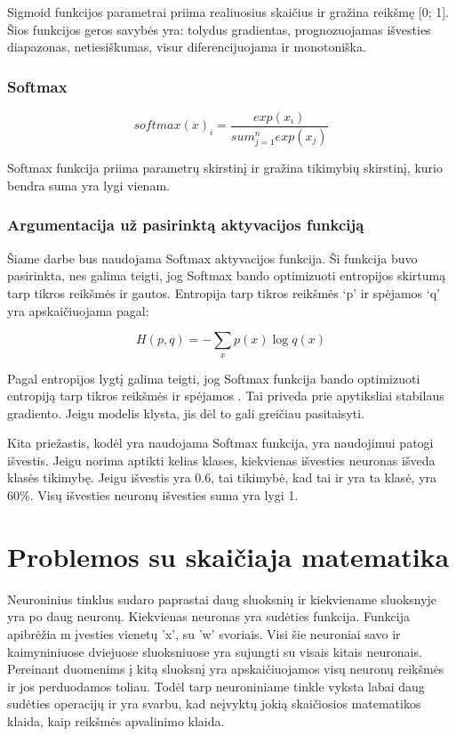 \documentclass{VUMIFInfKursinis}
\begin{document}
\par
Sigmoid funkcijos parametrai priima realiuosius skaičius ir gražina reikšmę [0; 1].
Šios funkcijos geros savybės yra: tolydus gradientas, prognozuojamas išvesties
diapazonas, netiesiškumas, visur diferencijuojama ir monotoniška. \cite{salt16}

\subsubsection{Softmax}
\[
  softmax(x)_i = \frac{exp(x_i)}{sum_{j=1}^{n}exp(x_j)}
\]

\par
Softmax funkcija priima parametrų skirstinį ir gražina tikimybių skirstinį,
kurio bendra suma yra lygi vienam. \cite{salt16}

\subsubsection{Argumentacija už pasirinktą aktyvacijos funkciją}
\par
Šiame darbe bus naudojama Softmax aktyvacijos funkcija. Ši funkcija buvo
pasirinkta, nes galima teigti, jog Softmax bando optimizuoti entropijos
skirtumą tarp tikros reikšmės ir gautos. Entropija tarp tikros reikšmės
‘p’ ir spėjamos ‘q’ yra apskaičiuojama pagal:

\[
H(p, q) = - \sum_{x}p(x) \log q(x)
\]

\par
Pagal entropijos lygtį galima teigti, jog Softmax funkcija
bando optimizuoti entropiją tarp tikros reikšmės ir spėjamos \cite{salt6}.
Tai priveda prie apytiksliai stabilaus gradiento. Jeigu modelis klysta,
jis dėl to gali greičiau pasitaisyti.
\par
Kita priežastis, kodėl yra naudojama Softmax funkcija, yra naudojimui
patogi išvestis. Jeigu norima aptikti kelias klases, kiekvienas išvesties
neuronas išveda klasės tikimybę. Jeigu išvestis yra 0.6, tai tikimybė, kad tai ir
yra ta klasė, yra 60\%. Visų išvesties neuronų išvesties suma yra lygi 1.

\section{Problemos su skaičiaja matematika}
\par
Neuroninius tinklus sudaro paprastai daug sluoksnių ir kiekviename sluoksnyje yra po
daug neuronų. Kiekvienas neuronas yra sudėties funkcija. Funkcija apibrėžia m įvesties
vienetų 'x', su 'w' svoriais. Visi šie neuroniai savo ir kaimyniniuose dviejuose sluoksniuose
yra sujungti su visais kitais neuronais. Pereinant duomenims į kitą sluoksnį yra apskaičiuojamos
visų neuronų reikšmės ir jos perduodamos toliau. Todėl tarp neuroniniame tinkle vyksta
labai daug sudėties operacijų ir yra svarbu, kad neįvyktų jokią skaičiosios matematikos klaida,
kaip reikšmės apvalinimo klaida.
\end{document}
